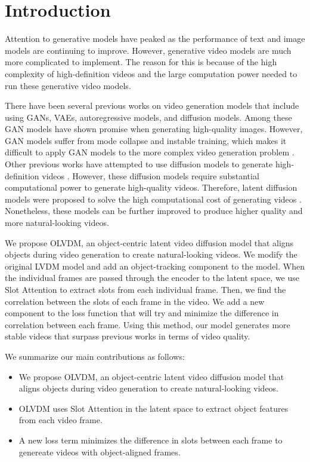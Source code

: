 \section{Introduction}

Attention to generative models have peaked as the performance of text and image models are continuing to improve. 
However, generative video models are much more complicated to implement. 
The reason for this is because of the high complexity of high-definition videos and the large computation power needed to run these generative video models.

There have been several previous works on video generation models that include using GANs, VAEs, autoregressive models, and diffusion models.
Among these GAN models have shown promise when generating high-quality images.
However, GAN models suffer from mode collapse and instable training, which makes it difficult to apply GAN models to the more complex video generation problem \cite{brock2018large, karras2019style}.
Other previous works have attempted to use diffusion models to generate high-definition videos \cite{ho2022imagen}.
However, these diffusion models require substantial computational power to generate high-quality videos.
Therefore, latent diffusion models were proposed to solve the high computational cost of generating videos \cite{he2022latent, blattmann2023align}.
Nonetheless, these models can be further improved to produce higher quality and more natural-looking videos.

We propose OLVDM, an object-centric latent video diffusion model that aligns objects during video generation to create natural-looking videos. We modify the original LVDM model and add an object-tracking component to the model. 
When the individual frames are passed through the encoder to the latent space, we use Slot Attention to extract slots from each individual frame. 
Then, we find the correlation between the slots of each frame in the video. 
We add a new component to the loss function that will try and minimize the difference in correlation between each frame. 
Using this method, our model generates more stable videos that surpass previous works in terms of video quality.

We summarize our main contributions as follows:
\begin{itemize}
    \item We propose OLVDM, an object-centric latent video diffusion model that aligns objects during video generation to create natural-looking videos.
    \item OLVDM uses Slot Attention in the latent space to extract object features from each video frame.
    \item A new loss term minimizes the difference in slots between each frame to genereate videos with object-aligned frames.
\end{itemize}
